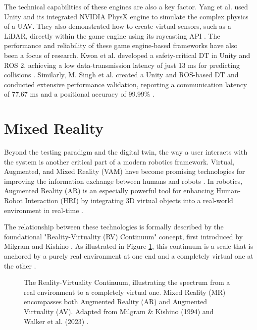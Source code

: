 The technical capabilities of these engines are also a key factor. Yang et al. used Unity and its integrated NVIDIA PhysX engine to simulate the complex physics of a UAV. They also demonstrated how to create virtual sensors, such as a LiDAR, directly within the game engine using its raycasting API \cite{Yang2020}. The performance and reliability of these game engine-based frameworks have also been a focus of research. Kwon et al. developed a safety-critical DT in Unity and ROS 2, achieving a low data-transmission latency of just 13 ms for predicting collisions \cite{Kwon2025}. Similarly, M. Singh et al. created a Unity and ROS-based DT and conducted extensive performance validation, reporting a communication latency of 77.67 ms and a positional accuracy of 99.99\% \cite{Singh2024b}.

\section{Mixed Reality}
\label{sec:MR}
Beyond the testing paradigm and the digital twin, the way a user interacts with the system is another critical part of a modern robotics framework. Virtual, Augmented, and Mixed Reality (VAM) have become promising technologies for improving the information exchange between humans and robots \cite{Walker2023}. In robotics, Augmented Reality (AR) is an especially powerful tool for enhancing Human-Robot Interaction (HRI) by integrating 3D virtual objects into a real-world environment in real-time \cite{MV20}.

The relationship between these technologies is formally described by the foundational "Reality-Virtuality (RV) Continuum" concept, first introduced by Milgram and Kishino \cite{MK94, Skarbez2021, MV20}. As illustrated in Figure \ref{fig:rv_continuum}, this continuum is a scale that is anchored by a purely real environment at one end and a completely virtual one at the other \cite{MK94, Skarbez2021, MV20}.

\begin{figure}[h]
\centering
\caption{The Reality-Virtuality Continuum, illustrating the spectrum from a real environment to a completely virtual one. Mixed Reality (MR) encompasses both Augmented Reality (AR) and Augmented Virtuality (AV). Adapted from Milgram \& Kishino (1994) \cite{MK94} and Walker et al. (2023) \cite{Walker2023}.}
\label{fig:rv_continuum}
\end{figure}

